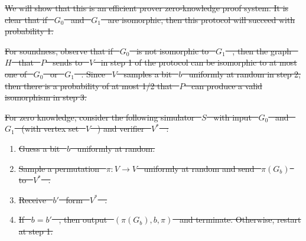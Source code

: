 \documentclass[12pt]{tufte-book}
\providecommand{\DIFdel}[1]{{\protect\color{red}\sout{#1}}}                      %
\begin{document}
\DIFdel{We will show that this is an efficient prover zero-knowledge proof system. It is clear that if \mbox{%
$G_0$
}%
and \mbox{%
$G_1$
}%
are isomorphic, then this protocol will succeed with probability 1.
    }%

\DIFdel{For soundness, observe that if \mbox{%
$G_0$
}%
is not isomorphic to \mbox{%
$G_1$
}%
, then the graph \mbox{%
$H$
}%
that \mbox{%
$P$
}%
sends to \mbox{%
$V$
}%
in step 1 of the protocol can be isomorphic to at most one of \mbox{%
$G_0$
}%
or \mbox{%
$G_1$
}%
. Since \mbox{%
$V$
}%
samples a bit \mbox{%
$b$
}%
uniformly at random in step 2, then there is a probability of at most 1/2 that \mbox{%
$P$
}%
can produce a valid isomorphism in step 3.
    }%

\DIFdel{For zero knowledge, consider the following simulator \mbox{%
$S$
}%
with input \mbox{%
$G_0$
}%
and \mbox{%
$G_1$
}%
(with vertex set \mbox{%
$V$
}%
) and verifier \mbox{%
$V^*$
}%
:
    }%

\begin{enumerate}%
\item%
\DIFdel{Guess a bit \mbox{%
$b$
}%
uniformly at random.
    }%

\item%
\DIFdel{Sample a permutation \mbox{%
$\pi: V \to V$
}%
uniformly at random and send \mbox{%
$\pi (G_b)$
}%
to \mbox{%
$V^*$
}%
.
    }%

\item%
\DIFdel{Receive \mbox{%
$b'$
}%
form \mbox{%
$V^*$
}%
.
    }%

\item%
\DIFdel{If \mbox{%
$b=b'$
}%
, then output \mbox{%
$(\pi (G_b), b, \pi)$
}%
and terminate. Otherwise, restart at step 1.
    }%


\end{enumerate}%
\end{document}

